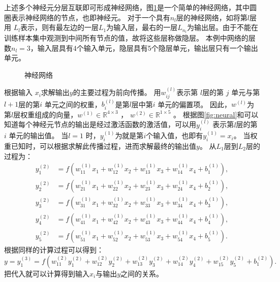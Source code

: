 上述多个神经元分层互联即可形成神经网络，图\ref{fig:network}是一个简单的神经网络，其中圆圈表示神经网络的节点，也即神经元。
对于一个具有$n_l$层的神经网络，如将第$ l $层用 $ L_l$表示，则有最左边的一层$  L_1$为输入层，最右的一层$ L_{n_l} $为输出层。由于不能在训练样本集中观测到中间所有节点的值，故将这些层称做隐层。
本例中网络的层数$n_l=3$，输入层具有4个输入单元，隐层具有5个隐层单元，输出层只有一个输出单元。

\begin{figure}[hbt]
\centering
\sWuhao

\caption{神经网络}
\label{fig:network}
\end{figure}

根据输入 $x_i$求解输出$y$的主要过程为前向传播。
用$ w^{(l)}_{ij}$表示第 $ l $层的第 $ j$ 单元与第 $l+1 $层的第$i$ 单元之间的权重，$ b^{(l)}_i $是第$l$层中第$i$ 单元的偏置项。
因此，$w^{(l)}$为第$l$层权重组成的向量，$ w^{(1)} \in \mathbb{R}^{4\times 3}$ ， $ w^{(2)} \in \mathbb{R}^{1\times 5}$ 。
根据图\ref{fig:neural}和可以知道每个神经元节点的输出是经过激活函数的激活值，可以用$ y^{(l)}_i$ 表示第$  l $层的第 $ i$ 单元的输出值。
当$  l=1$ 时，$  y^{(1)}_i$为就是第$  i $个输入值，也即有$  y^{(1)}_i = x_i $。
当权重已知时，可以根据求解此传播过程，进而求解最终的输出值$y$。
从$L_1$层到$L_2$层的过程为：
\begin{align}
  y_1^{(2)} &= f(w_{11}^{(1)}x_1 + w_{12}^{(1)} x_2 + w_{13}^{(1)} x_3 + w_{14}^{(1)} x_4 + b_1^{(1)}),  \\
  y_2^{(2)} &= f(w_{21}^{(1)}x_1 + w_{22}^{(1)} x_2 + w_{23}^{(1)} x_3 + w_{24}^{(1)} x_4 + b_2^{(1)}),  \\
  y_3^{(2)} &= f(w_{31}^{(1)}x_1 + w_{32}^{(1)} x_2 + w_{33}^{(1)} x_3 + w_{34}^{(1)} x_4 + b_3^{(1)}),
\end{align}
\begin{align}
  y_4^{(2)} &= f(w_{41}^{(1)}x_1 + w_{42}^{(1)} x_2 + w_{43}^{(1)} x_3 + w_{44}^{(1)} x_4 + b_4^{(1)}),  \\
  y_5^{(2)} &= f(w_{51}^{(1)}x_1 + w_{52}^{(1)} x_2 + w_{53}^{(1)} x_3 + w_{54}^{(1)} x_4 + b_5^{(1)}).
  \label{equ:fp1}
\end{align}
根据同样的计算过程可以得到：
\begin{equation}
  y = y_1^{(3)} =  f(w_{11}^{(2)} y_1^{(2)} + w_{12}^{(2)} y_2^{(2)} + w_{13}^{(2)} y_3^{(2)} + w_{14}^{(2)} y_4^{(2)} + w_{15}^{(2)} y_5^{(2)} + b_1^{(2)}).
  \label{equ:fp2}
\end{equation}
把代入就可以计算得到输入$x_i$与输出$y$之间的关系。
